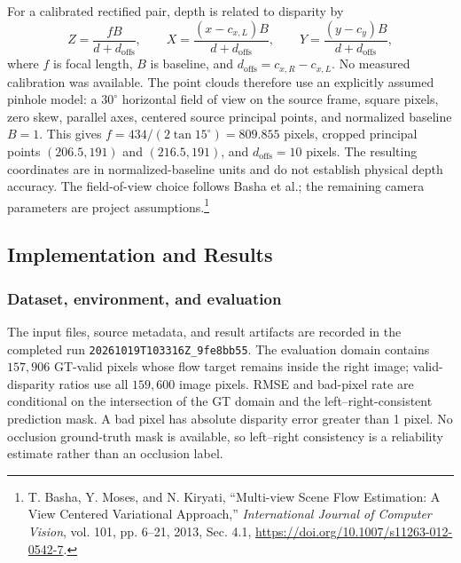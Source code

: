 \documentclass[a4paper,12pt]{article}
\begin{document}
For a calibrated rectified pair, depth is related to disparity by
\begin{equation}
Z=\frac{fB}{d+d_{\mathrm{offs}}},\qquad
X=\frac{(x-c_{x,L})B}{d+d_{\mathrm{offs}}},\qquad
Y=\frac{(y-c_y)B}{d+d_{\mathrm{offs}}},
\label{eq:b-reprojection}
\end{equation}
where $f$ is focal length, $B$ is baseline, and $d_{\mathrm{offs}}=c_{x,R}-c_{x,L}$. No measured calibration was available. The point clouds therefore use an explicitly assumed pinhole model: a $30^\circ$ horizontal field of view on the source frame, square pixels, zero skew, parallel axes, centered source principal points, and normalized baseline $B=1$. This gives $f=434/(2\tan15^\circ)=809.855$ pixels, cropped principal points $(206.5,191)$ and $(216.5,191)$, and $d_{\mathrm{offs}}=10$ pixels. The resulting coordinates are in normalized-baseline units and do not establish physical depth accuracy. The field-of-view choice follows Basha et al.; the remaining camera parameters are project assumptions.\footnote{T. Basha, Y. Moses, and N. Kiryati, “Multi-view Scene Flow Estimation: A View Centered Variational Approach,” \emph{International Journal of Computer Vision}, vol. 101, pp. 6--21, 2013, Sec. 4.1, \url{https://doi.org/10.1007/s11263-012-0542-7}.}

\subsection{Implementation and Results}

\subsubsection{Dataset, environment, and evaluation}
The input files, source metadata, and result artifacts are recorded in the completed run \texttt{20261019T103316Z\_9fe8bb55}. The evaluation domain contains $157{,}906$ GT-valid pixels whose flow target remains inside the right image; valid-disparity ratios use all $159{,}600$ image pixels. RMSE and bad-pixel rate are conditional on the intersection of the GT domain and the left--right-consistent prediction mask. A bad pixel has absolute disparity error greater than 1 pixel. No occlusion ground-truth mask is available, so left--right consistency is a reliability estimate rather than an occlusion label.
\end{document}
